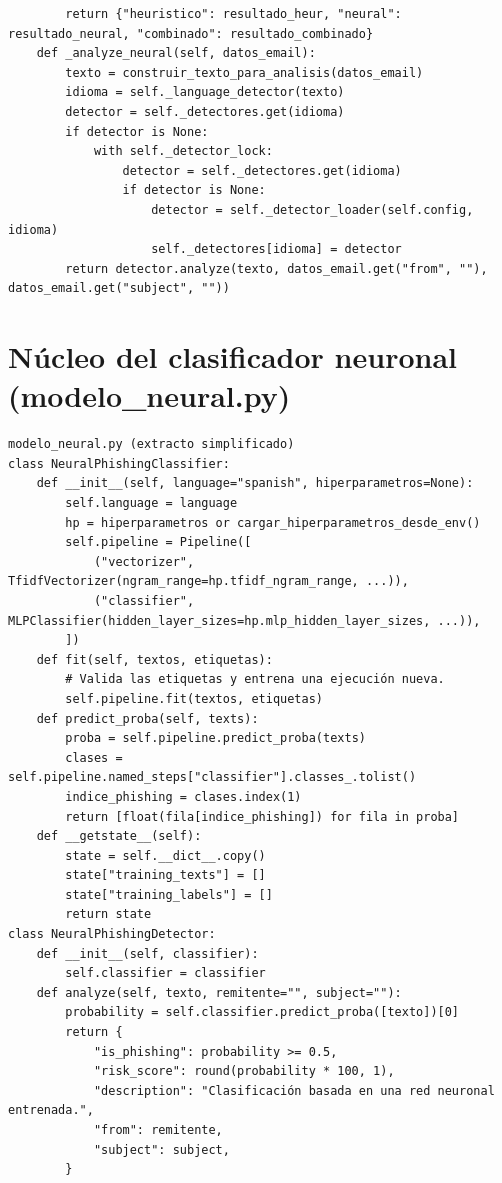\documentclass[11pt,a4paper,oneside]{report}
\begin{document}
\begin{lstlisting}
        return {"heuristico": resultado_heur, "neural": resultado_neural, "combinado": resultado_combinado}
    def _analyze_neural(self, datos_email):
        texto = construir_texto_para_analisis(datos_email)
        idioma = self._language_detector(texto)
        detector = self._detectores.get(idioma)
        if detector is None:
            with self._detector_lock:
                detector = self._detectores.get(idioma)
                if detector is None:
                    detector = self._detector_loader(self.config, idioma)
                    self._detectores[idioma] = detector
        return detector.analyze(texto, datos_email.get("from", ""), datos_email.get("subject", ""))
\end{lstlisting}

\section{Núcleo del clasificador neuronal (modelo\_neural.py)}

\begin{lstlisting}
modelo_neural.py (extracto simplificado)
class NeuralPhishingClassifier:
    def __init__(self, language="spanish", hiperparametros=None):
        self.language = language
        hp = hiperparametros or cargar_hiperparametros_desde_env()
        self.pipeline = Pipeline([
            ("vectorizer", TfidfVectorizer(ngram_range=hp.tfidf_ngram_range, ...)),
            ("classifier", MLPClassifier(hidden_layer_sizes=hp.mlp_hidden_layer_sizes, ...)),
        ])
    def fit(self, textos, etiquetas):
        # Valida las etiquetas y entrena una ejecución nueva.
        self.pipeline.fit(textos, etiquetas)
    def predict_proba(self, texts):
        proba = self.pipeline.predict_proba(texts)
        clases = self.pipeline.named_steps["classifier"].classes_.tolist()
        indice_phishing = clases.index(1)
        return [float(fila[indice_phishing]) for fila in proba]
    def __getstate__(self):
        state = self.__dict__.copy()
        state["training_texts"] = []
        state["training_labels"] = []
        return state
class NeuralPhishingDetector:
    def __init__(self, classifier):
        self.classifier = classifier
    def analyze(self, texto, remitente="", subject=""):
        probability = self.classifier.predict_proba([texto])[0]
        return {
            "is_phishing": probability >= 0.5,
            "risk_score": round(probability * 100, 1),
            "description": "Clasificación basada en una red neuronal entrenada.",
            "from": remitente,
            "subject": subject,
        }
\end{lstlisting}
\end{document}
